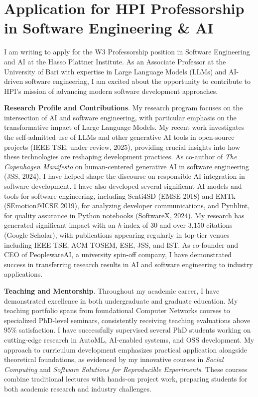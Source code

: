 \section{Application for HPI Professorship in Software Engineering \& AI}

I am writing to apply for the W3 Professorship position in Software Engineering and AI at the Hasso Plattner Institute.
As an Associate Professor at the University of Bari with expertise in Large Language Models (LLMs) and AI-driven software engineering, I am excited about the opportunity to contribute to HPI's mission of advancing modern software development approaches.

\textbf{Research Profile and Contributions}.
My research program focuses on the intersection of AI and software engineering, with particular emphasis on the transformative impact of Large Language Models.
My recent work investigates the self-admitted use of LLMs and other generative AI tools in open-source projects (IEEE TSE, under review, 2025), providing crucial insights into how these technologies are reshaping development practices. 
As co-author of \textit{The Copenhagen Manifesto} on human-centered generative AI in software engineering (JSS, 2024), I have helped shape the discourse on responsible AI integration in software development. 
I have also developed several significant AI models and tools for software engineering, including Senti4SD (EMSE 2018) and EMTk (SEmotion@ICSE 2019), for analyzing developer communications, and Pynblint, for quality assurance in Python notebooks (SoftwareX, 2024).
My research has generated significant impact with an \textit{h}-index of 30 and over 3,150 citations (Google Scholar), with publications appearing regularly in top-tier venues including IEEE TSE, ACM TOSEM, ESE, JSS, and IST.
As co-founder and CEO of PeoplewareAI, a university spin-off company, I have demonstrated success in transferring research results in AI and software engineering to industry applications. 

\textbf{Teaching and Mentorship}.
Throughout my academic career, I have demonstrated excellence in both undergraduate and graduate education. 
My teaching portfolio spans from foundational Computer Networks courses to specialized PhD-level seminars, consistently receiving teaching evaluations above 95\% satisfaction. 
I have successfully supervised several PhD students working on cutting-edge research in AutoML, AI-enabled systems, and OSS development. 
My approach to curriculum development emphasizes practical application alongside theoretical foundations, as evidenced by my innovative courses in \textit{Social Computing} and \textit{Software Solutions for Reproducible Experiments}.
These courses combine traditional lectures with hands-on project work, preparing students for both academic research and industry challenges.

